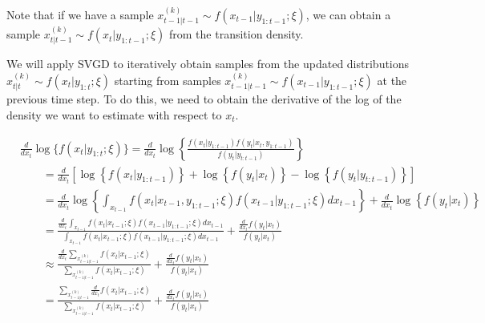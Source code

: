 \documentclass[]{article}
\begin{document}
Note that if we have a sample
\(x_{t-1|t-1}^{(k)} \sim f(x_{t-1} \vert y_{1:t-1} ;\xi)\), we can
obtain a sample \(x_{t|t-1}^{(k)} \sim f(x_t \vert y_{1:t-1} ;\xi)\)
from the transition density.

We will apply SVGD to iteratively obtain samples from the updated
distributions \(x_{t|t}^{(k)} \sim f(x_{t} \vert y_{1:t} ;\xi)\)
starting from samples
\(x_{t-1|t-1}^{(k)} \sim f(x_{t-1} \vert y_{1:t-1} ;\xi)\) at the
previous time step. To do this, we need to obtain the derivative of the
log of the density we want to estimate with respect to \(x_{t}\).

\begin{align*}
&\frac{d}{d x_t} \log\{f(x_{t} \vert y_{1:t}; \xi)\} = \frac{d}{d x_t} \log\left\{\frac{f(x_t \vert y_{1:t-1}) f(y_t \vert x_t, y_{1:t-1})}{f(y_t \vert y_{t:t-1})}\right\} \\
&\qquad = \frac{d}{d x_t} \left[ \log\left\{f(x_t \vert y_{1:t-1})\right\} + \log \left\{f(y_t \vert x_t)\right\} - \log\left\{f(y_t \vert y_{t:t-1})\right\} \right] \\
&\qquad = \frac{d}{d x_t} \log\left\{\int_{x_{t-1}}f(x_{t} \vert x_{t-1}, y_{1:t-1}; \xi)f(x_{t-1} \vert y_{1:t-1}; \xi) d x_{t-1} \right\} + \frac{d}{d x_t} \log \left\{ f(y_t \vert x_t) \right\} \\
&\qquad = \frac{\frac{d}{d x_t} \int_{x_{t-1}}f(x_{t} \vert x_{t-1}; \xi)f(x_{t-1} \vert y_{1:t-1}; \xi) d x_{t-1}}{\int_{x_{t-1}}f(x_{t} \vert x_{t-1}; \xi)f(x_{t-1} \vert y_{1:t-1}; \xi) d x_{t-1}} + \frac{\frac{d}{d x_t} f(y_t \vert x_t)}{f(y_t \vert x_t)} \\
&\qquad \approx \frac{\frac{d}{d x_t} \sum_{x_{t-1|t-1}^{(k)}}f(x_{t} \vert x_{t-1}; \xi)}{\sum_{x_{t-1|t-1}^{(k)}}f(x_{t} \vert x_{t-1}; \xi)} + \frac{\frac{d}{d x_t} f(y_t \vert x_t)}{f(y_t \vert x_t)} \\
&\qquad = \frac{\sum_{x_{t-1|t-1}^{(k)}} \frac{d}{d x_t} f(x_{t} \vert x_{t-1}; \xi)}{\sum_{x_{t-1|t-1}^{(k)}}f(x_{t} \vert x_{t-1}; \xi)} + \frac{\frac{d}{d x_t} f(y_t \vert x_t)}{f(y_t \vert x_t)}
\end{align*}
\end{document}
